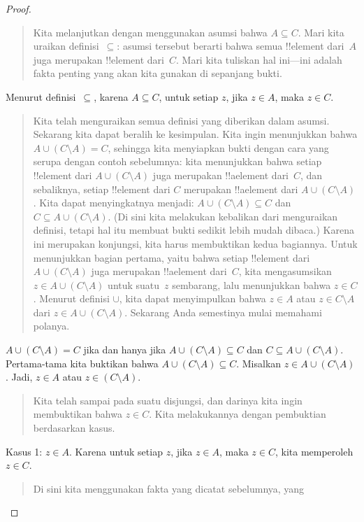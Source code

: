 \documentclass[../../../include/open-logic-section]{subfiles}
\begin{document}
\begin{proof}
\begin{quote}
    Kita melanjutkan dengan menggunakan asumsi bahwa $A \subseteq C$.
    Mari kita uraikan definisi~$\subseteq$: asumsi tersebut berarti
    bahwa semua !!{element} dari~$A$ juga merupakan !!{element}
    dari~$C$. Mari kita tuliskan hal ini---ini adalah fakta penting yang
    akan kita gunakan di sepanjang bukti.
  \end{quote}
  Menurut definisi~$\subseteq$, karena $A \subseteq C$, untuk setiap
  $z$, jika $z \in A$, maka $z \in C$.
  \begin{quote}
    Kita telah menguraikan semua definisi yang diberikan dalam asumsi.
    Sekarang kita dapat beralih ke kesimpulan. Kita ingin menunjukkan
    bahwa $A \cup (C \setminus A) = C$, sehingga kita menyiapkan bukti
    dengan cara yang serupa dengan contoh sebelumnya: kita menunjukkan
    bahwa setiap !!{element} dari $A \cup (C \setminus A)$ juga
    merupakan !!a{element} dari~$C$, dan sebaliknya, setiap !!{element}
    dari $C$ merupakan !!a{element} dari $A \cup (C \setminus A)$. Kita
    dapat menyingkatnya menjadi: $A \cup (C \setminus A) \subseteq C$
    dan $C \subseteq A \cup (C \setminus A)$. (Di sini kita melakukan
    kebalikan dari menguraikan definisi, tetapi hal itu membuat bukti
    sedikit lebih mudah dibaca.) Karena ini merupakan konjungsi, kita
    harus membuktikan kedua bagiannya. Untuk menunjukkan bagian
    pertama, yaitu bahwa setiap !!{element} dari $A \cup (C \setminus
    A)$ juga merupakan !!a{element} dari~$C$, kita mengasumsikan $z
    \in A \cup (C \setminus A)$ untuk suatu~$z$ sembarang, lalu
    menunjukkan bahwa $z \in C$. Menurut definisi $\cup$, kita dapat
    menyimpulkan bahwa $z \in A$ atau $z \in C \setminus A$ dari $z
    \in A \cup (C \setminus A)$. Sekarang Anda semestinya mulai
    memahami polanya.
  \end{quote}
  $A \cup (C \setminus A) = C$ jika dan hanya jika $A \cup (C
  \setminus A) \subseteq C$ dan $C \subseteq A \cup (C \setminus A)$.
  Pertama-tama kita buktikan bahwa $A \cup (C \setminus A) \subseteq
  C$. Misalkan $z \in A \cup (C \setminus A)$. Jadi, $z \in A$ atau
  $z \in (C \setminus A)$.
  \begin{quote}
    Kita telah sampai pada suatu disjungsi, dan darinya kita ingin
    membuktikan bahwa $z \in C$. Kita melakukannya dengan pembuktian
    berdasarkan kasus.
  \end{quote}
  Kasus 1: $z \in A$. Karena untuk setiap $z$, jika $z \in A$, maka $z
  \in C$, kita memperoleh $z \in C$.
  \begin{quote}
    Di sini kita menggunakan fakta yang dicatat sebelumnya, yang

\end{quote}
\end{proof}
\end{document}
